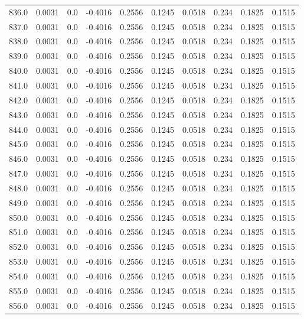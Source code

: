 \begin{longtable}{lrrrrrrrrr}
836.0 & 0.0031 & 0.0 & -0.4016 & 0.2556 & 0.1245 & 0.0518 & 0.234 & 0.1825 & 0.1515 \\
837.0 & 0.0031 & 0.0 & -0.4016 & 0.2556 & 0.1245 & 0.0518 & 0.234 & 0.1825 & 0.1515 \\
838.0 & 0.0031 & 0.0 & -0.4016 & 0.2556 & 0.1245 & 0.0518 & 0.234 & 0.1825 & 0.1515 \\
839.0 & 0.0031 & 0.0 & -0.4016 & 0.2556 & 0.1245 & 0.0518 & 0.234 & 0.1825 & 0.1515 \\
840.0 & 0.0031 & 0.0 & -0.4016 & 0.2556 & 0.1245 & 0.0518 & 0.234 & 0.1825 & 0.1515 \\
841.0 & 0.0031 & 0.0 & -0.4016 & 0.2556 & 0.1245 & 0.0518 & 0.234 & 0.1825 & 0.1515 \\
842.0 & 0.0031 & 0.0 & -0.4016 & 0.2556 & 0.1245 & 0.0518 & 0.234 & 0.1825 & 0.1515 \\
843.0 & 0.0031 & 0.0 & -0.4016 & 0.2556 & 0.1245 & 0.0518 & 0.234 & 0.1825 & 0.1515 \\
844.0 & 0.0031 & 0.0 & -0.4016 & 0.2556 & 0.1245 & 0.0518 & 0.234 & 0.1825 & 0.1515 \\
845.0 & 0.0031 & 0.0 & -0.4016 & 0.2556 & 0.1245 & 0.0518 & 0.234 & 0.1825 & 0.1515 \\
846.0 & 0.0031 & 0.0 & -0.4016 & 0.2556 & 0.1245 & 0.0518 & 0.234 & 0.1825 & 0.1515 \\
847.0 & 0.0031 & 0.0 & -0.4016 & 0.2556 & 0.1245 & 0.0518 & 0.234 & 0.1825 & 0.1515 \\
848.0 & 0.0031 & 0.0 & -0.4016 & 0.2556 & 0.1245 & 0.0518 & 0.234 & 0.1825 & 0.1515 \\
849.0 & 0.0031 & 0.0 & -0.4016 & 0.2556 & 0.1245 & 0.0518 & 0.234 & 0.1825 & 0.1515 \\
850.0 & 0.0031 & 0.0 & -0.4016 & 0.2556 & 0.1245 & 0.0518 & 0.234 & 0.1825 & 0.1515 \\
851.0 & 0.0031 & 0.0 & -0.4016 & 0.2556 & 0.1245 & 0.0518 & 0.234 & 0.1825 & 0.1515 \\
852.0 & 0.0031 & 0.0 & -0.4016 & 0.2556 & 0.1245 & 0.0518 & 0.234 & 0.1825 & 0.1515 \\
853.0 & 0.0031 & 0.0 & -0.4016 & 0.2556 & 0.1245 & 0.0518 & 0.234 & 0.1825 & 0.1515 \\
854.0 & 0.0031 & 0.0 & -0.4016 & 0.2556 & 0.1245 & 0.0518 & 0.234 & 0.1825 & 0.1515 \\
855.0 & 0.0031 & 0.0 & -0.4016 & 0.2556 & 0.1245 & 0.0518 & 0.234 & 0.1825 & 0.1515 \\
856.0 & 0.0031 & 0.0 & -0.4016 & 0.2556 & 0.1245 & 0.0518 & 0.234 & 0.1825 & 0.1515 \\

\end{longtable}
